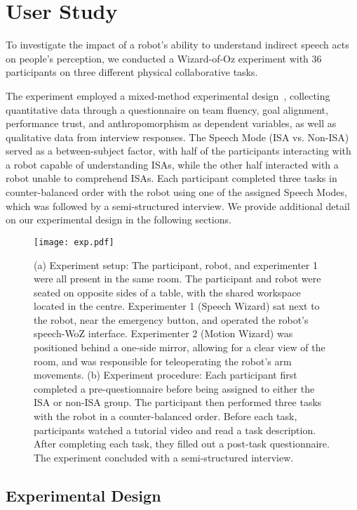 \section{User Study} \label{user_study}
To investigate the impact of a robot's ability to understand indirect speech acts on people's perception, we conducted a Wizard-of-Oz experiment with 36 participants on three different physical collaborative tasks.

The experiment employed a mixed-method experimental design~\cite{creswell1999mixed}, collecting quantitative data through a questionnaire on team fluency, goal alignment, performance trust, and anthropomorphism as dependent variables, as well as qualitative data from interview responses. The Speech Mode (ISA vs. Non-ISA) served as a between-subject factor, with half of the participants interacting with a robot capable of understanding ISAs, while the other half interacted with a robot unable to comprehend ISAs. Each participant completed three tasks in counter-balanced order with the robot using one of the assigned Speech Modes, which was followed by a semi-structured interview. We provide additional detail on our experimental design in the following sections.

\begin{figure*}
    \centering
    \texttt{[image: exp.pdf]}
    \caption{(a) Experiment setup: The participant, robot, and experimenter 1 were all present in the same room. The participant and robot were seated on opposite sides of a table, with the shared workspace located in the centre. Experimenter 1 (Speech Wizard) sat next to the robot, near the emergency button, and operated the robot's speech-WoZ interface. Experimenter 2 (Motion Wizard) was positioned behind a one-side mirror, allowing for a clear view of the room, and was responsible for teleoperating the robot's arm movements. (b) Experiment procedure: Each participant first completed a pre-questionnaire before being assigned to either the ISA or non-ISA group. The participant then performed three tasks with the robot in a counter-balanced order. Before each task, participants watched a tutorial video and read a task description. After completing each task, they filled out a post-task questionnaire. The experiment concluded with a semi-structured interview.\vspace{-1em}}
    \label{fig:exp}
\end{figure*}

\subsection{Experimental Design}

